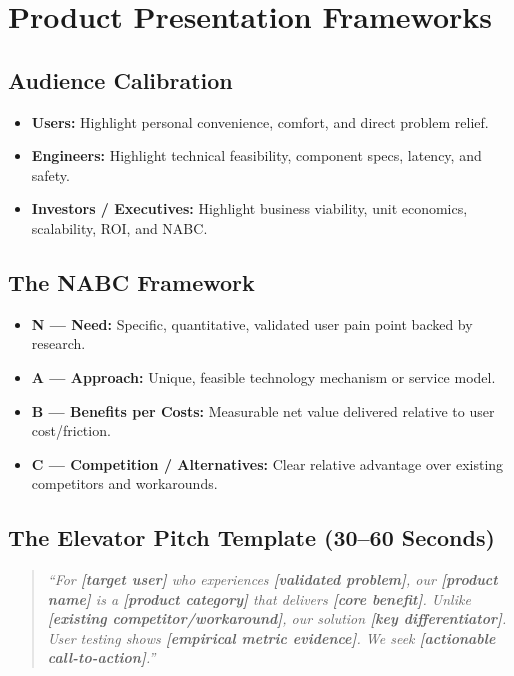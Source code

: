 \section{Product Presentation Frameworks}

\subsection{Audience Calibration}
\begin{itemize}[leftmargin=1.2em, itemsep=2pt]
    \item \textbf{Users:} Highlight personal convenience, comfort, and direct problem relief.
    \item \textbf{Engineers:} Highlight technical feasibility, component specs, latency, and safety.
    \item \textbf{Investors / Executives:} Highlight business viability, unit economics, scalability, ROI, and NABC.
\end{itemize}

\subsection{The NABC Framework}
\begin{itemize}[leftmargin=1.2em, itemsep=2pt]
    \item \textbf{N --- Need:} Specific, quantitative, validated user pain point backed by research.
    \item \textbf{A --- Approach:} Unique, feasible technology mechanism or service model.
    \item \textbf{B --- Benefits per Costs:} Measurable net value delivered relative to user cost/friction.
    \item \textbf{C --- Competition / Alternatives:} Clear relative advantage over existing competitors and workarounds.
\end{itemize}

\subsection{The Elevator Pitch Template (30--60 Seconds)}
\begin{quote}
\textit{``For \textbf{[target user]} who experiences \textbf{[validated problem]}, our \textbf{[product name]} is a \textbf{[product category]} that delivers \textbf{[core benefit]}. Unlike \textbf{[existing competitor/workaround]}, our solution \textbf{[key differentiator]}. User testing shows \textbf{[empirical metric evidence]}. We seek \textbf{[actionable call-to-action]}.''}
\end{quote}
